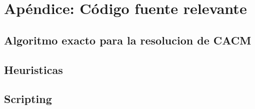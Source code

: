 \section{Ap\'endice: C\'odigo fuente relevante}


\subsection{Algoritmo exacto para la resolucion de CACM}


\subsection{Heuristicas}


\subsection{Scripting}
